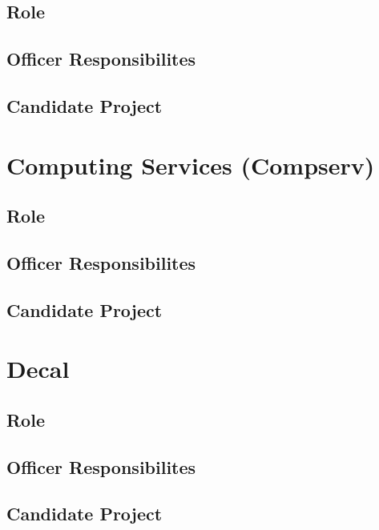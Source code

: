 \documentclass[11pt, article, oneside]{memoir}
\begin{document}
    \subsection{Role}

    \subsection{Officer Responsibilites}

    \subsection{Candidate Project}

    \bigbreak


    \section{Computing Services (Compserv)}
    \subsection{Role}

    \subsection{Officer Responsibilites}

    \subsection{Candidate Project}

    \bigbreak

    
    \section{Decal}
    \subsection{Role}

    \subsection{Officer Responsibilites}

    \subsection{Candidate Project}
\end{document}
